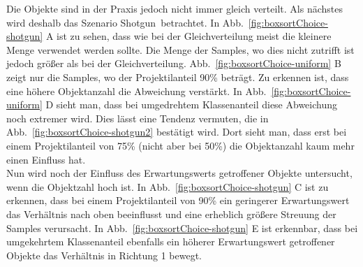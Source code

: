 Die Objekte sind in der Praxis jedoch nicht immer gleich verteilt. Als nächstes wird deshalb das Szenario \glqq Shotgun\grqq ~betrachtet. In Abb.~\ref{fig:boxsortChoice-shotgun} A ist zu sehen, dass wie bei der Gleichverteilung meist die kleinere Menge verwendet werden sollte. Die Menge der Samples, wo dies nicht zutrifft ist jedoch größer als bei der Gleichverteilung. Abb.~\ref{fig:boxsortChoice-uniform} B zeigt nur die Samples, wo der Projektilanteil 90\% beträgt. Zu erkennen ist, dass eine höhere Objektanzahl die Abweichung verstärkt. In Abb.~\ref{fig:boxsortChoice-uniform} D sieht man, dass bei umgedrehtem Klassenanteil diese Abweichung noch extremer wird. Dies lässt eine Tendenz vermuten, die in Abb.~\ref{fig:boxsortChoice-shotgun2} bestätigt wird. Dort sieht man, dass erst bei einem Projektilanteil von 75\% (nicht aber bei 50\%) die Objektanzahl kaum mehr einen Einfluss hat.\\
Nun wird noch der Einfluss des Erwartungswerts getroffener Objekte untersucht, wenn die Objektzahl hoch ist. In Abb.~\ref{fig:boxsortChoice-shotgun} C ist zu erkennen, dass bei einem Projektilanteil von 90\% ein geringerer Erwartungswert das Verhältnis nach oben beeinflusst und eine erheblich größere Streuung der Samples verursacht. In Abb.~\ref{fig:boxsortChoice-shotgun} E ist erkennbar, dass bei umgekehrtem Klassenanteil ebenfalls ein höherer Erwartungswert getroffener Objekte das Verhältnis in Richtung 1 bewegt.\\


